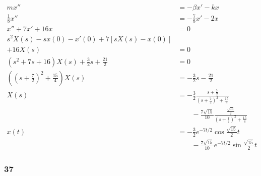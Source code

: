\documentclass{article}
\begin{document}
\begin{align*}
  m x''                                                               & = -\beta x' - k x                                                                                           \\
  \frac{1}{8} x''                                                     & = -\frac{7}{8} x' - 2 x                                                                                     \\
  x'' + 7 x' + 16 x                                                   & = 0                                                                                                         \\
  s^2 X(s) - s x(0) - x'(0) + 7 [s X(s) - x(0)]                       &                                                                                                             \\
  + 16 X(s)                                                           & = 0                                                                                                         \\
  (s^2 + 7 s + 16) X(s) + \frac{3}{2} s + \frac{21}{2}                & = 0                                                                                                         \\
  \left( \left( s + \frac{7}{2} \right)^2 + \frac{15}{4} \right) X(s) & = -\frac{3}{2} s - \frac{21}{2}                                                                             \\
  X(s)                                                                & = -\frac{3}{2} \frac{s + \frac{7}{2}}{\left( s + \frac{7}{2} \right)^2 + \frac{15}{4}}                      \\
                                                                      & \qquad - \frac{7 \sqrt{15}}{10} \frac{\frac{\sqrt{15}}{2}}{\left( s + \frac{7}{2} \right)^2 + \frac{15}{4}} \\
  x(t)                                                                & = -\frac{3}{2} e^{-7 t / 2} \cos \frac{\sqrt{15}}{2} t                                                      \\
                                                                      & \qquad - \frac{7 \sqrt{15}}{10} e^{-7 t / 2} \sin \frac{\sqrt{15}}{2} t
\end{align*}

\subsubsection{37}
\end{document}
